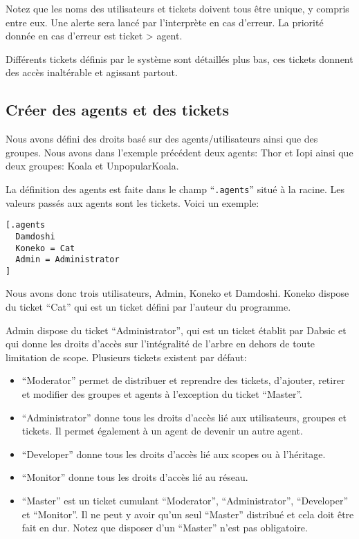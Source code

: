 \documentclass[a5paper, 12pt]{book}
\begin{document}
Notez que les noms des utilisateurs et tickets doivent tous
être unique, y compris entre eux. Une alerte sera lancé par l'interprète
en cas d'erreur. La priorité donnée en cas d'erreur est ticket > agent.

Différents tickets définis par le système sont détaillés plus bas,
ces tickets donnent des accès inaltérable et agissant partout.

\subsection{Créer des agents et des tickets}

Nous avons défini des droits basé sur des agents/utilisateurs
ainsi que des groupes. Nous avons dans l'exemple précédent
deux agents: Thor et Iopi ainsi que deux groupes: Koala et
UnpopularKoala.

La définition des agents est faite dans le champ ``\verb!.agents!''
situé à la racine. Les valeurs passés aux agents
sont les tickets. Voici un exemple:\\

\begin{verbatim}
[.agents
  Damdoshi
  Koneko = Cat
  Admin = Administrator
]
\end{verbatim}

Nous avons donc trois utilisateurs, Admin, Koneko et Damdoshi.
Koneko dispose du ticket ``Cat'' qui est un ticket défini
par l'auteur du programme.

Admin dispose du ticket ``Administrator'', qui est un ticket
établit par Dabsic et qui donne les droits d'accès sur
l'intégralité de l'arbre en dehors de toute limitation de scope.
Plusieurs tickets existent par défaut:

\begin{itemize}
  \item ``Moderator'' permet de distribuer et reprendre des tickets,
    d'ajouter, retirer et modifier des groupes et agents à
    l'exception du ticket ``Master''.
  \item ``Administrator'' donne tous les droits d'accès lié
    aux utilisateurs, groupes et tickets. Il permet également
    à un agent de devenir un autre agent.
  \item ``Developer'' donne tous les droits d'accès lié
    aux scopes ou à l'héritage.
  \item ``Monitor'' donne tous les droits d'accès lié au
    réseau.
  \item ``Master'' est un ticket cumulant ``Moderator'',
    ``Administrator'', ``Developer'' et ``Monitor''. Il
    ne peut y avoir qu'un seul ``Master'' distribué et
    cela doit être fait en dur. Notez que disposer
    d'un ``Master'' n'est pas obligatoire.
\end{itemize}
\end{document}
